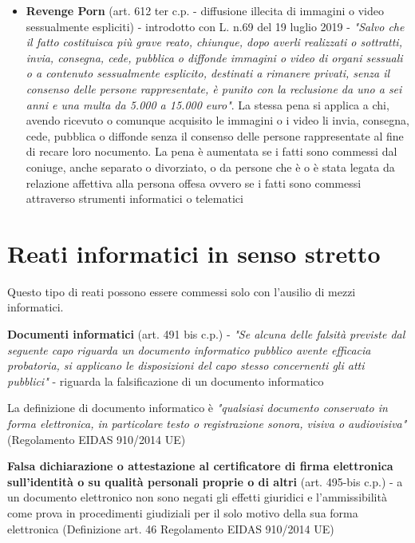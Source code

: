 \begin{itemize}
    \item \textbf{Revenge Porn} (art. 612 ter c.p. - diffusione illecita di immagini o video sessualmente espliciti) - introdotto con L. n.69 del 19 luglio 2019 - \textit{"Salvo che il fatto costituisca più grave reato, chiunque, dopo averli realizzati o sottratti, invia, consegna, cede, pubblica o diffonde immagini o video di organi sessuali o a contenuto sessualmente esplicito, destinati a rimanere privati, senza il consenso delle persone rappresentate, è punito con la reclusione da uno a sei anni e una multa da 5.000 a 15.000 euro"}. La stessa pena si applica a chi, avendo ricevuto o comunque acquisito le immagini o i video li invia, consegna, cede, pubblica o diffonde senza il consenso delle persone rappresentate al fine di recare loro nocumento. La pena è aumentata se i fatti sono commessi dal coniuge, anche separato o divorziato, o da persone che è o è stata legata da relazione affettiva alla persona offesa ovvero se i fatti sono commessi attraverso strumenti informatici o telematici
\end{itemize}

\section{Reati informatici in senso stretto}
Questo tipo di reati possono essere commessi solo con l'ausilio di mezzi informatici.

\vspace{5mm}

\textbf{Documenti informatici} (art. 491 bis c.p.) - \textit{"Se alcuna delle falsità previste dal seguente capo riguarda un documento informatico pubblico avente efficacia probatoria, si applicano le disposizioni del capo stesso concernenti gli atti pubblici"} - riguarda la falsificazione di un documento informatico

\vspace{5mm}

La definizione di documento informatico è \textit{"qualsiasi documento conservato in forma elettronica, in particolare testo o registrazione sonora, visiva o audiovisiva"} (Regolamento EIDAS 910/2014 UE)

\vspace{5mm}


\textbf{Falsa dichiarazione o attestazione al certificatore di firma elettronica sull'identità o su qualità personali proprie o di altri} (art. 495-bis c.p.) - a un documento elettronico non sono negati gli effetti giuridici e l'ammissibilità come prova in procedimenti giudiziali per il solo motivo della sua forma elettronica (Definizione art. 46 Regolamento EIDAS 910/2014 UE)

